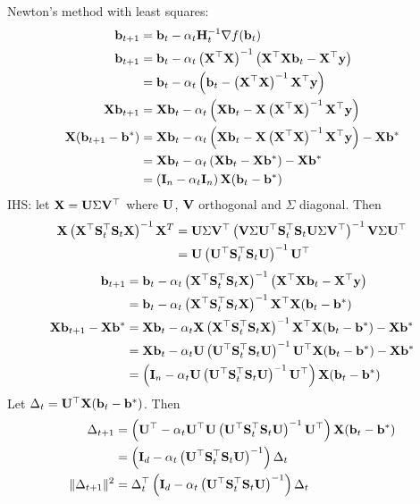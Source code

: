 \documentclass[10pt]{article}
\begin{document}
Newton's method with least squares:
\begin{align*}
\bfb_{t+1} &= \bfb_t - \alpha_t\bfH_t^{-1}\nabla f(\bfb_t) \\
\bfb_{t+1} &= \bfb_t - \alpha_t\left(\bfX^\T\bfX\right)^{-1}\left(\bfX^\T\bfX\bfb_t-\bfX^\T\bfy\right) \\
&= \bfb_t - \alpha_t\left(\bfb_t-\left(\bfX^\T\bfX\right)^{-1}\bfX^\T\bfy\right) \\
\bfX\bfb_{t+1} &= \bfX\bfb_t - \alpha_t\left(\bfX\bfb_t-\bfX\left(\bfX^\T\bfX\right)^{-1}\bfX^\T\bfy\right) \\
\bfX(\bfb_{t+1}-\bfb^*) &= \bfX\bfb_t - \alpha_t\left(\bfX\bfb_t-\bfX\left(\bfX^\T\bfX\right)^{-1}\bfX^\T\bfy\right) - \bfX\bfb^* \\
&= \bfX\bfb_t - \alpha_t\left(\bfX\bfb_t-\bfX\bfb^*\right) - \bfX\bfb^* \\
&= \left(\bfI_n - \alpha_t\bfI_n\right)\bfX(\bfb_t-\bfb^*)
\end{align*}
IHS: let $\bfX=\bfU\Sigma\bfV^\T$ where $\bfU$, $\bfV$ orthogonal and $\Sigma$ diagonal. Then
\begin{align*}
\bfX\left(\bfX^\T\bfS_t^\T\bfS_t\bfX\right)^{-1}\bfX^T &= \bfU\Sigma\bfV^\T\left(\bfV\Sigma\bfU^\T\bfS_t^\T\bfS_t\bfU\Sigma\bfV^\T\right)^{-1}\bfV\Sigma\bfU^\T \\
&= \bfU\left(\bfU^\T\bfS_t^\T\bfS_t\bfU\right)^{-1}\bfU^\T
\end{align*}
\begin{align*}
\bfb_{t+1} &= \bfb_t - \alpha_t\left(\bfX^\T\bfS_t^\T\bfS_t\bfX\right)^{-1}\left(\bfX^\T\bfX\bfb_t-\bfX^\T\bfy\right) \\
&= \bfb_t - \alpha_t\left(\bfX^\T\bfS_t^\T\bfS_t\bfX\right)^{-1}\bfX^\T\bfX(\bfb_t-\bfb^*) \\
\bfX\bfb_{t+1} - \bfX\bfb^* &= \bfX\bfb_t - \alpha_t\bfX\left(\bfX^\T\bfS_t^\T\bfS_t\bfX\right)^{-1}\bfX^\T\bfX(\bfb_t-\bfb^*) - \bfX\bfb^* \\
&= \bfX\bfb_t - \alpha_t\bfU\left(\bfU^\T\bfS_t^\T\bfS_t\bfU\right)^{-1}\bfU^\T\bfX(\bfb_t-\bfb^*) - \bfX\bfb^* \\
&= \left(\bfI_n - \alpha_t\bfU\left(\bfU^\T\bfS_t^\T\bfS_t\bfU\right)^{-1}\bfU^\T\right)\bfX(\bfb_t-\bfb^*)
\end{align*}
Let $\Delta_t = \bfU^\T\bfX(\bfb_t-\bfb^*)$. Then
\begin{align*}
\Delta_{t+1} &= \left(\bfU^\T - \alpha_t\bfU^\T\bfU\left(\bfU^\T\bfS_t^\T\bfS_t\bfU\right)^{-1}\bfU^\T\right)\bfX(\bfb_t-\bfb^*) \\
&= \left(\bfI_d - \alpha_t\left(\bfU^\T\bfS_t^\T\bfS_t\bfU\right)^{-1}\right)\Delta_t \\
\|\Delta_{t+1}\|^2 &= \Delta_t^\T\left(\bfI_d - \alpha_t\left(\bfU^\T\bfS_t^\T\bfS_t\bfU\right)^{-1}\right)\Delta_t
\end{align*}
\end{document}
